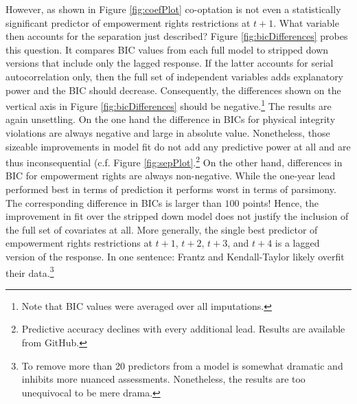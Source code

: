 However, as shown in Figure \ref{fig:coefPlot} co-optation
is not even a statistically significant predictor of
empowerment rights restrictions at $t+1$. What
variable then accounts for the separation just described? 
Figure \ref{fig:bicDifferences} probes this question. It
compares BIC values from each full model to stripped down 
versions that include only the lagged response. If the 
latter accounts for serial autocorrelation only, then 
the full set of independent variables adds explanatory power
and the BIC should decrease. Consequently, the differences 
shown on the vertical axis in 
Figure \ref{fig:bicDifferences} should be 
negative.\footnote{Note that BIC values were averaged over 
all imputations.} The results are again unsettling. On the 
one hand the difference in BICs for physical integrity 
violations are always negative and large in absolute 
value. Nonetheless, those sizeable improvements in model fit
do not add any predictive power at all and are thus 
inconsequential (c.f. Figure 
\ref{fig:sepPlot}.\footnote{Predictive accuracy declines 
with every additional lead. Results are available from
GitHub.} On the other hand, differences in BIC for 
empowerment rights are always non-negative. While
the one-year lead performed best in terms of prediction 
it performs worst in terms of parsimony. The corresponding 
difference in BICs is larger than $100$ points! Hence, the
improvement in fit over the stripped down model does not 
justify the inclusion of the full set of covariates at all. 
More generally, the single best predictor of empowerment 
rights restrictions at $t+1$, $t+2$, $t+3$, and $t+4$ is a 
lagged version of the response. In one sentence: 
Frantz and Kendall-Taylor likely overfit their 
data.\footnote{To remove more than 20 predictors from a 
model is somewhat dramatic and inhibits more nuanced 
assessments. Nonetheless, the results are too unequivocal to 
be mere drama.}


